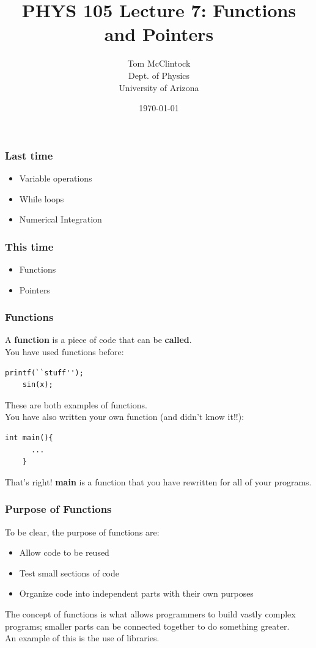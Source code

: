 \documentclass{beamer}
\title{PHYS 105 Lecture 7: Functions and Pointers}
\author{Tom McClintock \\
	Dept. of Physics\\
	University of Arizona
}
\date{\today}
\begin{document}
\begin{frame}
  \titlepage
\end{frame}

\begin{frame}
  \frametitle{Last time}
  \begin{itemize}
    \item Variable operations
    \item While loops
    \item Numerical Integration
  \end{itemize}
\end{frame}

\begin{frame}
  \frametitle{This time}
  \begin{itemize}
    \item Functions
    \item Pointers
  \end{itemize}
\end{frame}

\begin{frame}[fragile]
  \frametitle{Functions}
  A \textbf{function} is a piece of code that can be \textbf{called}.\\
  You have used functions before:
  \begin{lstlisting}[style=customc]
    printf(``stuff'');
    sin(x);
  \end{lstlisting}
  These are both examples of functions.\\
  You have also written your own function (and didn't know it!!):
  \begin{lstlisting}[style=customc]
    int main(){
      ...
    }
  \end{lstlisting}
  That's right! \textbf{main} is a function that you have 
  rewritten for all of your programs.
\end{frame}

\begin{frame}
  \frametitle{Purpose of Functions}
  To be clear, the purpose of functions are:
  \begin{itemize}
    \item Allow code to be reused
    \item Test small sections of code
    \item Organize code into independent parts with their own purposes
  \end{itemize}
  The concept of functions is what allows 
  programmers to build vastly complex programs; smaller parts can be
  connected together to do something greater.\\
  An example of this is the use of libraries.
\end{frame}
\end{document}
